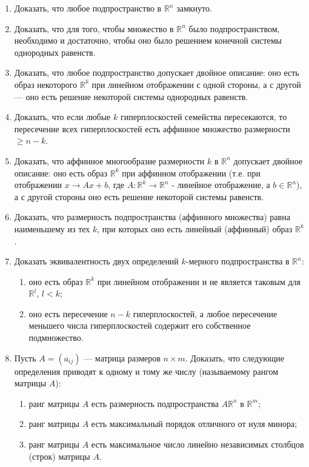 	\begin{enumerate}
		\item Доказать, что любое подпространство в $\mathbb{R}^n$ замкнуто.

		\item Доказать, что для того, чтобы множество в $\mathbb{R}^n$ было подпространством, необходимо и достаточно, чтобы оно было решением конечной системы однородных равенств.

		\item Доказать, что любое подпространство допускает двойное описание: оно есть образ некоторого $\mathbb{R}^k$ при линейном отображении с одной стороны, а с другой — оно есть решение некоторой системы однородных равенств.

		\item Доказать, что если любые $k$ гиперплоскостей семейства пересекаются, то пересечение всех гиперплоскостей есть аффинное множество размерности $\ge n-k$.

		\item Доказать, что аффинное многообразие размерности $k$ в $\mathbb{R}^n$ допускает двойное описание: оно есть образ $\mathbb{R}^k$ при аффинном отображении (т.е. при отображении $x \rightarrow Ax + b$, где $A:\mathbb{R}^k \to \mathbb{R}^n$ - линейное отображение, а $b \in \mathbb{R}^n$), а с другой стороны оно есть решение некоторой системы равенств.

		\item Доказать, что размерность подпространства (аффинного множества) равна наименьшему из тех $k$, при которых оно есть линейный (аффинный) образ $\mathbb{R}^k$.

		\item Доказать эквивалентность двух определений $k$-мерного подпространства в $\mathbb{R}^n$:
		\begin{enumerate}
			\item оно есть образ $\mathbb{R}^k$ при линейном отображении и не является таковым для $\mathbb{R}^l$, $l < k$;
			\item оно есть пересечение $n-k$ гиперплоскостей, а любое пересечение меньшего числа гиперплоскостей содержит его собственное подмножество.
		\end{enumerate}

		\item Пусть $A = (a_{ij})$ — матрица размеров $n \times m$. Доказать, что следующие определения приводят к одному и тому же числу (называемому рангом матрицы $A$):
		\begin{enumerate}
			\item ранг матрицы $A$ есть размерность подпространства $A\mathbb{R}^n$ в $\mathbb{R}^m$;
			\item ранг матрицы $A$ есть максимальный порядок отличного от нуля минора;
			\item ранг матрицы $A$ есть максимальное число линейно независимых столбцов (строк) матрицы $A$.
		\end{enumerate}


\end{enumerate}
